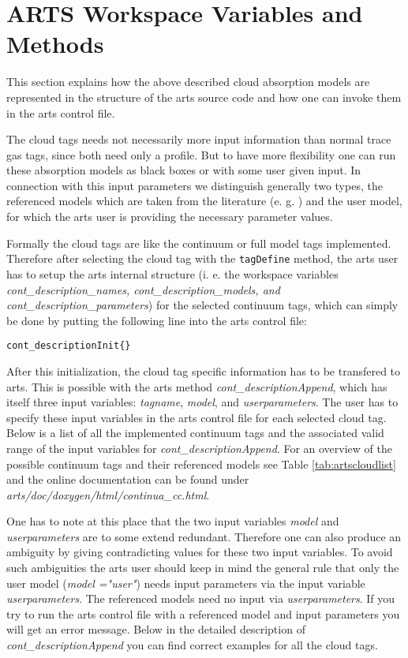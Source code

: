 \section{ARTS Workspace Variables and Methods}
\label{levelb:ArtsImplementationCloudAbsorption}

This section explains how the above described cloud absorption models
are represented in the structure of the arts source code and how 
one can invoke them in the arts control file.

The cloud tags needs not necessarily more input information than 
normal trace gas tags, since both need only a profile. But to have 
more flexibility one can run these absorption models as black boxes 
or with some user given input. In connection with this input parameters 
we distinguish generally two types, the referenced models which 
are taken from the literature (e. g. \citet{liebeetal:93}) and the 
user model, for which the arts user is providing the necessary 
parameter values.

Formally the cloud tags are like the 
continuum or full model tags implemented. Therefore after selecting 
the cloud tag with the {\tt tagDefine} method, the arts user has to 
setup the arts internal structure (i. e. the workspace variables 
{\it cont\_description\_names, cont\_description\_models, 
and cont\_description\_parameters}) for the selected continuum tags, 
which can simply be done by putting the following line into the 
arts control file:
\begin{lstlisting}
cont_descriptionInit{}
\end{lstlisting}

After this initialization, the cloud tag specific
information has to be transfered to arts. This is possible with the 
arts method {\it cont\_descriptionAppend}, which has itself 
three input variables: {\it tagname}, {\it model}, and 
{\it userparameters}. The user has to specify these input 
variables in the arts control file for each selected cloud tag. 
Below is a list of all the implemented continuum tags and the associated
valid range of the input variables for {\it cont\_descriptionAppend}. 
For an overview of the possible continuum tags and their 
referenced models see Table \ref{tab:artscloudlist} and the 
online documentation can be found under 
{\it arts/doc/doxygen/html/continua\_cc.html}.

One has to note at this place that the two input variables {\it model} and
{\it userparameters} are to some extend redundant. Therefore one can also 
produce an ambiguity by giving contradicting values for these two input variables.
To avoid such ambiguities the arts user should keep in mind the general 
rule that only the user model ({\it model ="user"}) needs input parameters 
via the input variable {\it userparameters}. The referenced models 
need no input via {\it userparameters}. If you try to run the arts control 
file with a referenced model and input parameters you will get an error message.
Below in the detailed description of {\it cont\_descriptionAppend} you 
can find correct examples for all the cloud tags.

